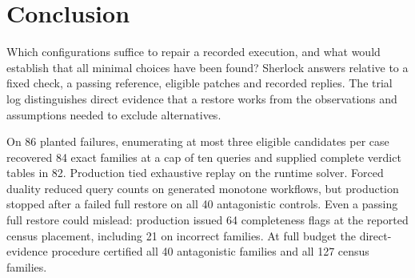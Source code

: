 \documentclass[11pt,letterpaper]{article}
\begin{document}
\section{Conclusion}
Which configurations suffice to repair a recorded execution, and what would establish that all minimal choices have been found? Sherlock answers relative to a fixed check, a passing reference, eligible patches and recorded replies. The trial log distinguishes direct evidence that a restore works from the observations and assumptions needed to exclude alternatives.

On 86 planted failures, enumerating at most three eligible candidates per case recovered 84 exact families at a cap of ten queries and supplied complete verdict tables in 82. Production tied exhaustive replay on the runtime solver. Forced duality reduced query counts on generated monotone workflows, but production stopped after a failed full restore on all 40 antagonistic controls. Even a passing full restore could mislead: production issued 64 completeness flags at the reported census placement, including 21 on incorrect families. At full budget the direct-evidence procedure certified all 40 antagonistic families and all 127 census families.
\end{document}
